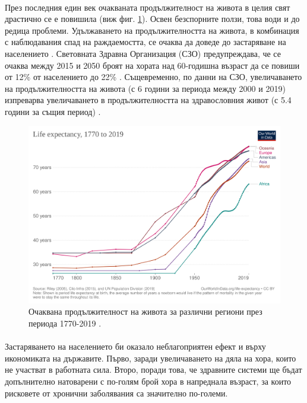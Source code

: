 \documentclass[pdftex,cyrillic,14pt,a4page,twoside]{extreport}
\begin{document}
\paragraph{}
През последния един век очакваната продължителност на живота в целия свят драстично се е повишила \cite{zijdeman2016} (виж фиг. \ref{fig:life_expectancy}). Освен безспорните ползи, това води и до редица проблеми. Удължаването на продължителността на живота, в комбинация с наблюдавания спад на раждаемостта, се очаква да доведе до застаряване на населението \cite{lutz2008}. Световната Здравна Организация (СЗО) предупреждава, че се очаква между 2015 и 2050 броят на хората над 60-годишна възраст да се повиши от 12\% от населението до 22\% \cite{who_report_ageing2015}. Същевременно, по данни на СЗО, увеличаването на продължителността на живота (с 6 години за периода между 2000 и 2019) изпреварва увеличаването в продължителността на здравословния живот (с 5.4 години за същия период) \cite{who_health2020}. \\
\begin{figure}[h]
  \centering
  \includegraphics[width=12cm]{figures/life-expectancy}
  \caption {Очаквана продължителност на живота за различни региони през периода 1770-2019 \cite{zijdeman2016}.}
  \label{fig:life_expectancy}
\end{figure}

\paragraph{}
Застаряването на населението би оказало неблагоприятен ефект и върху икономиката на държавите. Първо, заради увеличаването на дяла на хора, които не участват в работната сила. Второ, поради това, че здравните системи ще бъдат допълнително натоварени с по-голям брой хора в напреднала възраст, за които рисковете от хронични заболявания са значително по-големи.
\end{document}
